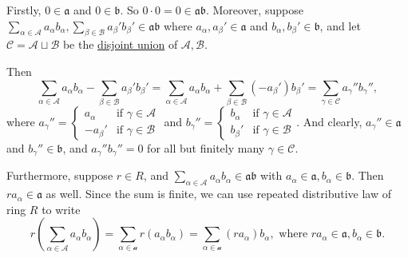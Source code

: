 Firstly, \(0 \in \mathfrak{a}\) and \(0 \in \mathfrak{b}\). So \(0 \cdot 0 = 0 \in \mathfrak{a}\mathfrak{b}\). Moreover, suppose \(\sum_{\alpha \in \mathcal{A}} a_\alpha b_\alpha, \sum_{\beta \in \mathcal{B}} a_\beta' b_\beta' \in \mathfrak{ab}\) where \(a_\alpha, a_\beta' \in \mathfrak{a}\) and \(b_\alpha, b_\beta' \in \mathfrak{b}\), and let \(\mathcal{C} = \mathcal{A} \sqcup \mathcal{B}\) be the \href{https://math.stackexchange.com/questions/1631396/what-is-the-difference-between-disjoint-union-and-union}{disjoint union} of \(\mathcal{A}, \mathcal{B}\).

Then \[
    \sum_{\alpha \in \mathcal{A}} a_\alpha b_\alpha - \sum_{\beta \in \mathcal{B}} a_\beta' b_\beta' = \sum_{\alpha \in \mathcal{A}} a_\alpha b_\alpha + \sum_{\beta \in \mathcal{B}} (-a_\beta') b_\beta' = \sum_{\gamma \in \mathcal{C}} a_\gamma'' b_\gamma'',
\]
where \(a_\gamma'' = \begin{cases}
    a_\alpha &\text{if } \gamma \in \mathcal{A}\\
    -a_\beta' &\text{if } \gamma \in \mathcal{B}
\end{cases}\) and \(b_\gamma'' = \begin{cases}
    b_\alpha &\text{if } \gamma \in \mathcal{A}\\
    b_\beta' &\text{if } \gamma \in \mathcal{B}
\end{cases}\). And clearly, \(a_\gamma'' \in \mathfrak{a}\) and \(b_\gamma'' \in \mathfrak{b}\), and \(a_\gamma''b_\gamma'' = 0\) for all but finitely many  \(\gamma \in \mathcal{C}\).

Furthermore, suppose \(r \in R\), and \(\sum_{\alpha \in \mathcal{A}} a_\alpha b_\alpha \in \mathfrak{ab}\) with \(a_\alpha \in  \mathfrak{a}, b_\alpha \in \mathfrak{b}\). Then \(ra_\alpha \in  \mathfrak{a}\) as well. Since the sum is finite, we can use repeated distributive law of ring \(R\) to write 
\[
    r \left(\sum_{\alpha \in \mathcal{A}} a_\alpha b_\alpha\right) = \sum_{\alpha \in \mathcal{a}} r (a_\alpha b_\alpha) =  \sum_{\alpha \in \mathcal{a}} (r a_\alpha) b_\alpha, \text{ where } ra_\alpha \in \mathfrak{a}, b_\alpha \in \mathfrak{b}.
\]

